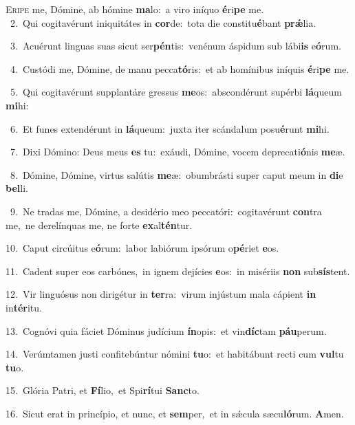 \lettrine{\initial\textcolor{\initialcolor}{E}}{ripe} me, Dómine, ab hómine \textbf{ma}\-lo:~\star a viro iníquo \textbf{é}\-ri\textbf{pe} me.\\
{\numbfont\textcolor{\numbcolor}{~2.}}~Qui cogitavérunt iniquitátes in \textbf{cor}\-de:~\star tota die constitu\-\textbf{é}\-bant \textbf{prǽ}\-lia.\par
{\numbfont\textcolor{\numbcolor}{~3.}}~Acuérunt linguas suas sicut ser\-\textbf{pén}\-tis:~\star venénum áspidum sub lábi\textbf{is} e\-\textbf{ó}\-rum.\par
{\numbfont\textcolor{\numbcolor}{~4.}}~Custódi me, Dómine, de manu pecca\-\textbf{tó}\-ris:~\star et ab homínibus iníquis \textbf{é}\-ri\textbf{pe} me.\par
{\numbfont\textcolor{\numbcolor}{~5.}}~Qui cogitavérunt supplantáre gressus \textbf{me}\-os:~\star abscondérunt supérbi \textbf{lá}\-queum \textbf{mi}\-hi:\par
{\numbfont\textcolor{\numbcolor}{~6.}}~Et funes extendérunt in \textbf{lá}\-queum:~\star juxta iter scándalum posu\-\textbf{é}\-runt \textbf{mi}\-hi.\par
{\numbfont\textcolor{\numbcolor}{~7.}}~Dixi Dómino: Deus meus \textbf{es} tu:~\star exáudi, Dómine, vocem deprecati\-\textbf{ó}\-nis \textbf{me}\-æ.\par
{\numbfont\textcolor{\numbcolor}{~8.}}~Dómine, Dómine, virtus salútis \textbf{me}\-æ:~\star obumbrásti super caput meum in \textbf{di}\-e \textbf{bel}\-li.\par
{\numbfont\textcolor{\numbcolor}{~9.}}~Ne tradas me, Dómine, a desidério meo peccatóri:~\dagger cogitavérunt \textbf{con}\-tra me,~\star ne derelínquas me, ne forte \textbf{ex}\-al\-\textbf{tén}\-tur.\par
{\numbfont\textcolor{\numbcolor}{10.}}~Caput circúitus e\-\textbf{ó}\-rum:~\star labor labiórum ipsórum o\-\textbf{pé}\-riet \textbf{e}\-os.\par
{\numbfont\textcolor{\numbcolor}{11.}}~Cadent super eos carbónes,~\dagger in ignem dejícies \textbf{e}\-os:~\star in misériis \textbf{non} sub\-\textbf{sís}\-tent.\par
{\numbfont\textcolor{\numbcolor}{12.}}~Vir linguósus non dirigétur in \textbf{ter}\-ra:~\star virum injústum mala cápient \textbf{in} in\-\textbf{tér}\-itu.\par
{\numbfont\textcolor{\numbcolor}{13.}}~Cognóvi quia fáciet Dóminus judícium \textbf{ín}\-opis:~\star et vin\-\textbf{díc}\-tam \textbf{páu}\-perum.\par
{\numbfont\textcolor{\numbcolor}{14.}}~Verúmtamen justi confitebúntur nómini \textbf{tu}\-o:~\star et habitábunt recti cum \textbf{vul}\-tu \textbf{tu}\-o.\par
{\numbfont\textcolor{\numbcolor}{15.}}~Glória Patri, et \textbf{Fí}\-lio,~\star et Spi\-\textbf{rí}\-tui \textbf{Sanc}\-to.\par
{\numbfont\textcolor{\numbcolor}{16.}}~Sicut erat in princípio, et nunc, et \textbf{sem}\-per,~\star et in sǽcula sæcu\-\textbf{ló}\-rum. \textbf{A}\-men.\par

